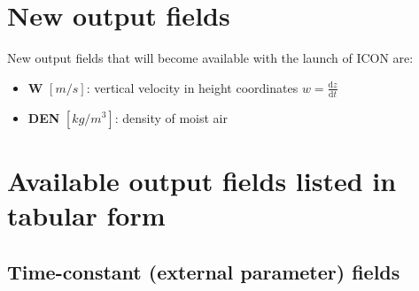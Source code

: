 \section{New output fields}\label{sec_newout}
New output fields that will become available with the launch of ICON are:
\begin{itemize}
 \item \textbf{W} $[m/s]$: vertical velocity in height coordinates $w=\frac{\mathrm{d}z}{\mathrm{d}t}$
 \item \textbf{DEN} $[kg/m^{3}]$: density of moist air
\end{itemize}



\section{Available output fields listed in tabular form}

\subsection{Time-constant (external parameter) fields}

